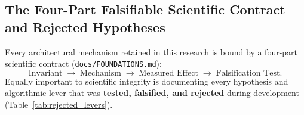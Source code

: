 \documentclass[10pt]{article}
\theoremstyle{definition}
\begin{document}
\subsection{The Four-Part Falsifiable Scientific Contract and Rejected Hypotheses}

Every architectural mechanism retained in this research is bound by a four-part scientific contract (\texttt{docs/FOUNDATIONS.md}):
\begin{equation}
  \text{Invariant} \;\longrightarrow\; \text{Mechanism} \;\longrightarrow\; \text{Measured Effect} \;\longrightarrow\; \text{Falsification Test}.
\end{equation}
Equally important to scientific integrity is documenting every hypothesis and algorithmic lever that was \textbf{tested, falsified, and rejected} during development (Table~\ref{tab:rejected_levers}).
\end{document}

